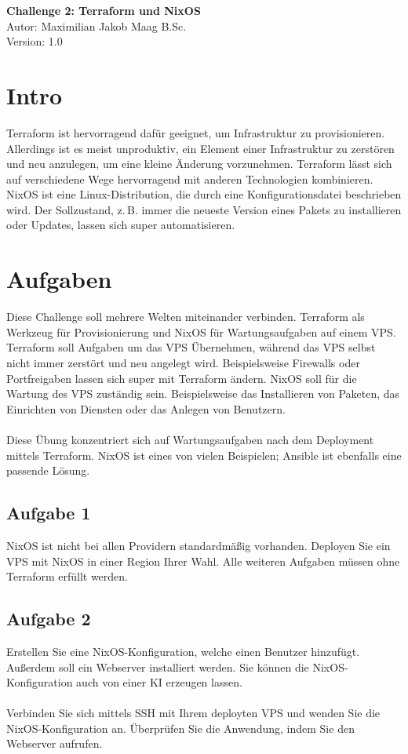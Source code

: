 \documentclass{article}
\begin{document}
    \begin{center}
        \Large \textbf{Challenge 2: Terraform und NixOS} \\ [6pt]
        \normalsize
        Autor: Maximilian Jakob Maag B.Sc. \\
        Version: 1.0
    \end{center}
    \section{Intro}
    Terraform ist hervorragend dafür geeignet, um Infrastruktur zu provisionieren. Allerdings ist es meist unproduktiv, ein Element einer Infrastruktur zu zerstören und neu anzulegen,
    um eine kleine Änderung vorzunehmen. Terraform lässt sich auf verschiedene Wege hervorragend mit anderen Technologien kombinieren.
    NixOS ist eine Linux-Distribution, die durch eine Konfigurationsdatei beschrieben wird.
    Der Sollzustand, z. B. immer die neueste Version eines Pakets zu installieren oder Updates, lassen sich super automatisieren.

    \section{Aufgaben}
    Diese Challenge soll mehrere Welten miteinander verbinden. Terraform als Werkzeug für Provisionierung und NixOS für Wartungsaufgaben auf einem VPS.
    Terraform soll Aufgaben um das VPS Übernehmen, während das VPS selbst nicht immer zerstört und neu angelegt wird. Beispielsweise Firewalls oder Portfreigaben lassen sich super mit Terraform ändern.
    NixOS soll für die Wartung des VPS zuständig sein. Beispielsweise das Installieren von Paketen, das Einrichten von Diensten oder das Anlegen von Benutzern. \\ \\
    Diese Übung konzentriert sich auf Wartungsaufgaben nach dem Deployment mittels Terraform. NixOS ist eines von vielen Beispielen; Ansible ist ebenfalls eine passende Lösung.

    \subsection{Aufgabe 1}
    NixOS ist nicht bei allen Providern standardmäßig vorhanden.
    Deployen Sie ein VPS mit NixOS in einer Region Ihrer Wahl. Alle weiteren Aufgaben müssen ohne Terraform erfüllt werden.

    \subsection{Aufgabe 2}
    Erstellen Sie eine NixOS-Konfiguration, welche einen Benutzer hinzufügt. Außerdem soll ein Webserver installiert werden.
    Sie können die NixOS-Konfiguration auch von einer KI erzeugen lassen. \\ \\
    Verbinden Sie sich mittels SSH mit Ihrem deployten VPS und wenden Sie die NixOS-Konfiguration an. Überprüfen Sie die Anwendung, indem Sie den Webserver aufrufen.
\end{document}
